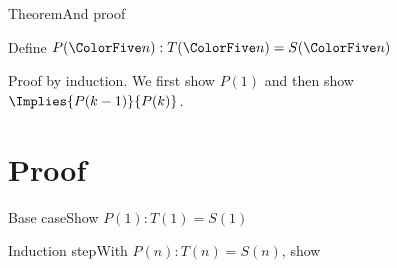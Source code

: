 {\begin{frame}{Theorem}{And proof}
\Vskip{-3em}\begin{theorem}
\begin{center}
Define $P(\N):  T(\N)=S(\N)$ \\
\end{center}
\end{theorem}
Proof by induction.  We first show $P(1)$ and then show $\Implies{P(k-1)}{P(k)}$.
    
\end{frame}

\section*{Proof}
\begin{frame}{Base case}{Show $P(1): T(1)=S(1)$}
\Vskip{-4em}\begin{center}\ThTop{\N}\end{center}
\SmallSkip{}
\begin{Reasoning}
%
%
%
\end{Reasoning}

\Vskip{-2em}
\end{frame}

\def\W{\ensuremath{w}}
\def\V{\ColorFive{\ensuremath{v}}}
\begin{frame}{Induction step}{With $P(n): T(n)=S(n)$, show }
\Vskip{-4.3em}\begin{center}\ThTop{\N}\end{center}
\SmallSkip{}


\end{frame}}

